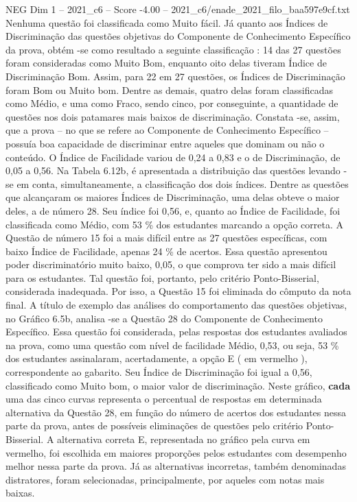 \begin{textsample}{NEG Dim 1 – 2021\_c6 – Score -4.00 – 2021\_c6/enade\_2021\_filo\_baa597e9cf.txt}
Nenhuma questão foi classificada como Muito fácil.
Já quanto aos Índices de Discriminação das questões objetivas do Componente de Conhecimento Específico da prova, obtém -se como resultado a seguinte classificação : 14 das 27 questões foram consideradas como Muito Bom, enquanto oito delas tiveram Índice de Discriminação Bom.
Assim, para 22 em 27 questões, os Índices de Discriminação foram Bom ou Muito bom.
Dentre as demais, quatro delas foram classificadas como Médio, e uma como Fraco, sendo cinco, por conseguinte, a quantidade de questões nos dois patamares mais baixos de discriminação.
Constata -se, assim, que a prova – no que se refere ao Componente de Conhecimento Específico – possuía boa capacidade de discriminar entre aqueles que dominam ou não o conteúdo.
O Índice de Facilidade variou de 0,24 a 0,83 e o de Discriminação, de 0,05 a 0,56.
Na Tabela 6.12b, é apresentada a distribuição das questões levando -se em conta, simultaneamente, a classificação dos dois índices.
Dentre as questões que alcançaram os maiores Índices de Discriminação, uma delas obteve o maior deles, a de número 28.
Seu índice foi 0,56, e, quanto ao Índice de Facilidade, foi classificada como Médio, com 53 \% dos estudantes marcando a opção correta.
A Questão de número 15 foi a mais difícil entre as 27 questões específicas, com baixo Índice de Facilidade, apenas 24 \% de acertos.
Essa questão apresentou poder discriminatório muito baixo, 0,05, o que comprova ter sido a mais difícil para os estudantes.
Tal questão foi, portanto, pelo critério Ponto-Bisserial, considerada inadequada.
Por isso, a Questão 15 foi eliminada do cômputo da nota final.
A título de exemplo das análises do comportamento das questões objetivas, no Gráfico 6.5b, analisa -se a Questão 28 do Componente de Conhecimento Específico.
Essa questão foi considerada, pelas respostas dos estudantes avaliados na prova, como uma questão com nível de facilidade Médio, 0,53, ou seja, 53 \% dos estudantes assinalaram, acertadamente, a opção E ( em vermelho ), correspondente ao gabarito.
Seu Índice de Discriminação foi igual a 0,56, classificado como Muito bom, o maior valor de discriminação.
Neste gráfico, \textbf{cada} uma das cinco curvas representa o percentual de respostas em determinada alternativa da Questão 28, em função do número de acertos dos estudantes nessa parte da prova, antes de possíveis eliminações de questões pelo critério Ponto-Bisserial.
A alternativa correta E, representada no gráfico pela curva em vermelho, foi escolhida em maiores proporções pelos estudantes com desempenho melhor nessa parte da prova.
Já as alternativas incorretas, também denominadas distratores, foram selecionadas, principalmente, por aqueles com notas mais baixas.

\end{textsample}

